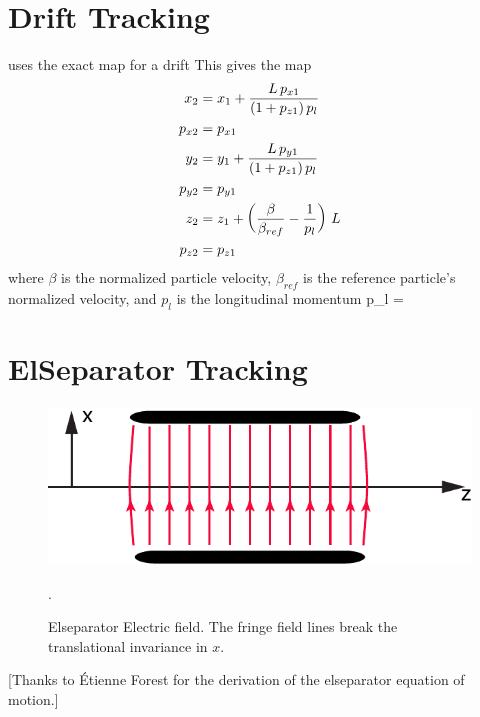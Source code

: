 \section{Drift Tracking}
\label{s:drift.std}

\bmad uses the exact map for a drift
This gives the map
\begin{align}
  x_2    &= x_1 + \frac{L \, p_{x1}}{(1 + p_{z1}) \, p_l} \nonumber \\
  p_{x2} &= p_{x1}  \nonumber \\
  y_2    &= y_1 + \frac{L \, p_{y1}}{(1 + p_{z1}) \, p_l} \nonumber \\
  p_{y2} &= p_{y1}  \\
  z_2    &= z_1 + \left( \frac{\beta}{\beta_{ref}} - \frac{1}{p_l} \right) \, L \nonumber \\
  p_{z2} &= p_{z1} \nonumber
\end{align}
where $\beta$ is the normalized particle velocity, $\beta_{ref}$ is 
the reference particle's normalized velocity, and $p_l$ is the
longitudinal momentum
\Begineq
  p_l = 
\Endeq

\section{ElSeparator Tracking}
\label{s:elsep.std}

\begin{figure}[tb]
  \centering
  \includegraphics[width=5in]{elseparator.pdf}
  \caption[ElSeparator electric field.]
  {
Elseparator Electric field. The fringe field lines break the
translational invariance in $x$.
  }
  \label{f:elsep}.
\end{figure}

[Thanks to \'Etienne Forest for the derivation of the elseparator equation of motion.]

